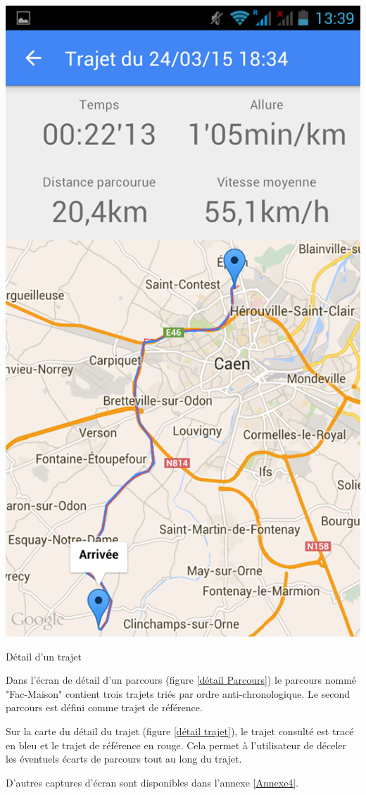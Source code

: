 \begin{multicols}{2}
\begin{img}
  \includegraphics[scale=0.35]{img/trajet.jpg}
  \caption{Détail d'un trajet}
  \label{détail trajet}
\end{img}
\end{multicols}

Dans l'écran de détail d'un parcours (figure \ref{détail Parcours}) le parcours nommé "Fac-Maison" contient trois trajets triés par ordre anti-chronologique. Le second parcours est défini comme trajet de référence.\bigskip

Sur la carte du détail du trajet (figure \ref{détail trajet}), le trajet consulté est tracé en bleu et le trajet de référence en rouge. Cela permet à l'utilisateur de déceler les éventuels écarts de parcours tout au long du trajet.\bigskip

D'autres captures d'écran sont disponibles dans l'annexe \ref{Annexe4}.